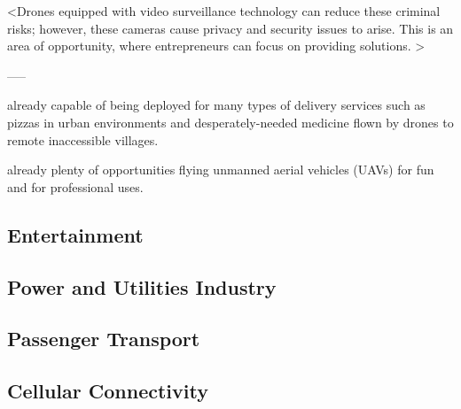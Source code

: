 <Drones equipped with video surveillance technology can reduce these criminal risks; however, these cameras cause privacy and security issues to arise. This is an area of opportunity, where entrepreneurs can focus on providing solutions. >

-----


already capable of being deployed for many types of delivery services 
such as pizzas in urban environments and 
desperately-needed medicine flown by drones to remote inaccessible villages.


already plenty of opportunities 
flying unmanned aerial vehicles (UAVs) for fun 
and for professional uses. %





\subsection{Entertainment}


\subsection{Power and Utilities Industry}


\subsection{Passenger Transport}



\subsection{Cellular Connectivity}


